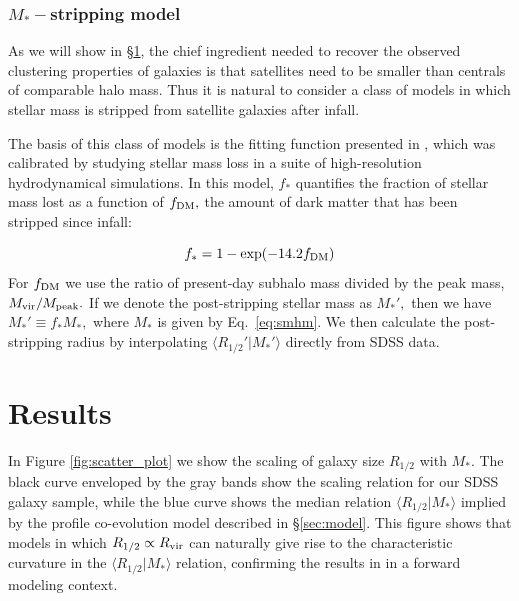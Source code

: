 \documentclass[usenatbib,usegraphicx,letterpaper]{mn2e}
\newcommand{\beq}{\begin{equation}}
\newcommand{\eeq}{\end{equation}}
\newcommand{\rhalf}{R_{1/2}}
\newcommand{\mstar}{M_{\ast}}
\newcommand{\rvir}{R_{\rm vir}}
\begin{document}
\subsubsection{$\mstar-$stripping model}
\label{subsubsec:strippingmodel}

As we will show in \S\ref{sec:results}, the chief ingredient needed to recover the observed clustering properties of galaxies is that satellites need to be smaller than centrals of comparable halo mass. Thus it is natural to consider a class of models in which stellar mass is stripped from satellite galaxies after infall. 

The basis of this class of models is the fitting function presented in \citet{smith_etal16}, which was calibrated by studying stellar mass loss in a suite of high-resolution hydrodynamical simulations. In this model, $f_{\ast}$ quantifies the fraction of stellar mass lost as a function of $f_{\rm DM},$ the amount of dark matter that has been stripped since infall:

\beq
f_{\ast} = 1 - \exp(-14.2f_{\rm DM})
\eeq
For $f_{\rm DM}$ we use the ratio of present-day subhalo mass divided by the peak mass, $M_{\rm vir}/M_{\rm peak}.$ If we denote the post-stripping stellar mass as $M_{\ast}',$ then we have $M_{\ast}'\equiv f_{\ast}M_{\ast},$ where $M_{\ast}$ is given by Eq.~\ref{eq:smhm}. We then calculate the post-stripping radius by interpolating $\langle\rhalf'\vert\mstar'\rangle$ directly from SDSS data. 

\section{Results}
\label{sec:results}

In Figure \ref{fig:scatter_plot} we show the scaling of galaxy size $\rhalf$ with $\mstar.$ The black curve enveloped by the gray bands show the scaling relation for our SDSS galaxy sample, while the blue curve shows the median relation $\langle\rhalf\vert\mstar\rangle$ implied by the profile co-evolution model described in \S\ref{sec:model}. This figure shows that models in which $\rhalf\propto\rvir$ can naturally give rise to the characteristic curvature in the $\langle\rhalf\vert\mstar\rangle$ relation, confirming the results in \citet{kravtsov13} in a forward modeling context. 
\end{document}
